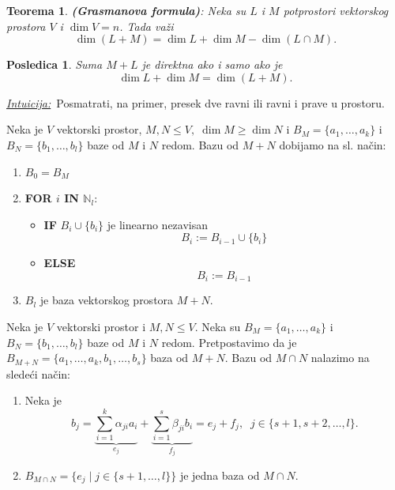 \documentclass[a4paper,12pt,twoside]{report}
\newtheorem{theorem}{Teorema}[section]
\newtheorem{corollary}{Posledica}[theorem]
\numberwithin{algorithm}{section}
\newcommand{\intuicija}{\noindent\underline{\textit{Intuicija:}}\ }
\begin{document}
\begin{theorem}
    \textbf{(Grasmanova formula)}: \label{Grasman} Neka su $L$ i $M$ potprostori vektorskog prostora $V$ i $\dim V = n$. Tada važi
    \[ \dim (L + M) = \dim L + \dim M - \dim(L \cap M). \]
\end{theorem}

\begin{corollary}
    Suma $M + L$ je direktna ako i samo ako je \[\dim L + \dim M = \dim(L + M).\]
\end{corollary}

\intuicija Posmatrati, na primer, presek dve ravni ili ravni i prave u prostoru.

\begin{algorithm}[!h]
    \caption{Nalaženje baze sume potprostora}
    Neka je $V$ vektorski prostor, $M, N \leq V, \; \dim M \geq \dim N$ i $B_M = \{a_1, \dots, a_k\}$ i $B_N = \{b_1, \dots, b_l\}$
    baze od $M$ i $N$ redom. Bazu od $M + N$ dobijamo na sl. način:

    \begin{enumerate}
        \item $B_0 = B_M$
        \item \textbf{FOR $i$ IN $\mathbb{N}_l$}:
        \begin{itemize}
            \item \textbf{IF} $B_i \cup \{b_i\}$ je linearno nezavisan
            \[ B_{i} := B_{i-1} \cup \{b_i\} \]
            \item \textbf{ELSE}
            \[ B_{i} := B_{i-1} \]
        \end{itemize}
        \item $B_l$ je baza vektorskog prostora $M + N$.
    \end{enumerate}
    \label{NalazenjeBazeSumePotprostora}
\end{algorithm}
\newpage
\begin{algorithm}[!h]
    \caption{Nalaženje baze preseka potprostora}
    Neka je $V$ vektorski prostor i $M, N \leq V$. Neka su $B_M = \{a_1,\dots, a_k\}$ i $B_N = \{b_1, \dots, b_l\}$ baze od 
    $M$ i $N$ redom. Pretpostavimo da je $B_{M+N} = \{a_1, \dots, a_k, b_1, \dots, b_s\}$ baza od $M+N$. Bazu od $M \cap N$
    nalazimo na sledeći način:

    \begin{enumerate}
        \item Neka je 
        \[ b_j = \underbrace{\sum_{i=1}^{k}\alpha_{ji}a_i}_{e_j} + \underbrace{\sum_{i=1}^{s}\beta_{ji}b_i}_{f_j} = e_j + f_j, \;\; j \in \{s+1, s+2, \dots, l\}. \]
        \item $\displaystyle B_{M \cap N} = \{e_j \; |\; j \in \{ s+1, \dots, l \}\}$ je jedna baza od $M \cap N$.
    \end{enumerate}
\end{algorithm}
\end{document}
